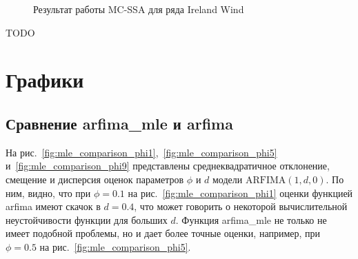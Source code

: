 \documentclass[specialist,
substylefile = spbu_report.rtx,
subf,href,colorlinks=true, 12pt]{disser}
\theoremstyle{definition}
\begin{document}
\begin{figure}[h!]
	\centering
	\caption{Результат работы MC-SSA для ряда Ireland Wind}
	\label{fig:IrelandWind_mcssa}
\end{figure}

\conclusion
TODO




\appendix
\chapter{Графики}
\section{Сравнение \textsf{arfima\_mle} и \textsf{arfima}}\label{sect:mle_comparison}
На рис.~\ref{fig:mle_comparison_phi1},~\ref{fig:mle_comparison_phi5} и~\ref{fig:mle_comparison_phi9} представлены среднеквадратичное отклонение, смещение и дисперсия оценок параметров $\phi$ и $d$ модели $\mathrm{ARFIMA}(1, d, 0)$. По ним, видно, что при $\phi=0.1$ на рис.~\ref{fig:mle_comparison_phi1} оценки функцией \textsf{arfima} имеют скачок в $d=0.4$, что может говорить о некоторой вычислительной неустойчивости функции для больших $d$. Функция \textsf{arfima\_mle} не только не имеет подобной проблемы, но и дает более точные оценки, например, при $\phi=0.5$ на рис.~\ref{fig:mle_comparison_phi5}.
\end{document}
